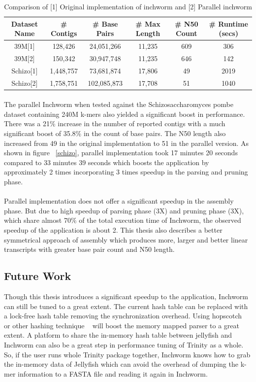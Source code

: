\label{key}\documentclass[plainarticle, english ,zihtitle,final,hyperref,utf8]{zihpub}
\begin{document}
\begin{table}
\begin{center}
\begin{tabular}{| c | c | c | c | c | c |}        
\hline            
Dataset Name & \# Contigs & \# Base Pairs & \# Max Length & \# N50 Count & \# Runtime (secs) \\	\hline
39M[1] & 128,426 & 24,051,266 & 11,235 & 609 & 306 \\ \hline
39M[2] & 150,342 & 30,947,748 & 11,235 & 646 & 142 \\ \hline
Schizo[1] & 1,448,757 & 73,681,874 & 17,806 & 49 & 2019 \\ \hline
Schizo[2] & 1,758,751 & 102,085,873 & 17,708 & 51 & 1040 \\
\hline  
\end{tabular}
\end{center}
\caption{Comparison of [1] Original implementation of inchworm and [2] Parallel inchworm}
\end{table}
\paragraph{}
The parallel Inchworm when tested against the Schizosaccharomyces pombe dataset containing 240M k-mers also yielded a significant boost in performance. There was a  21\% increase in the number of reported contigs  with a much significant boost of 35.8\% in the count of base pairs. The N50 length also increased from 49 in the original implementation to 51 in the parallel version. As shown in figure ~\ref{schizo}, parallel implementation took 17 minutes 20 seconds compared to 33 minutes 39 seconds which boosts the application by approximately 2 times incorporating 3 times speedup in the parsing and pruning phase.
\paragraph{}
Parallel implementation does not offer a significant speedup in the assembly phase. But due to high speedup of parsing phase (3X) and pruning phase (3X), which share almost 70\% of the total execution time of Inchworm, the observed speedup of the application is about 2. This thesis also describes a better symmetrical approach of assembly which produces more, larger and better linear transcripts with greater base pair count and N50 length.

\subsection{Future Work}
Though this thesis introduces a significant speedup to the application, Inchworm can still be tuned to a great extent. The current hash table can be replaced with a lock-free hash table removing the synchronization overhead. Using hopscotch ~\cite{hopscotch} or other hashing technique ~\cite{tock} will boost the memory mapped parser to a great extent. A platform to share the in-memory hash table between jellyfish and Inchworm can also be a great step in performance tuning of Trinity as a whole. So, if the user runs whole Trinity package together, Inchworm knows how to grab the in-memory data of Jellyfish which can avoid the overhead of dumping the k-mer information to a FASTA file and reading it again in Inchworm. 
\end{document}
